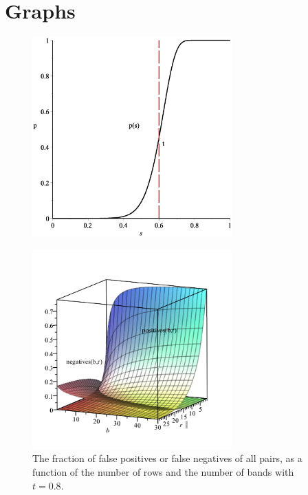 
\section{Graphs}
\label{sec:graph}
\begin{figure}[H]
	\includegraphics[width=290px]{img/pGraphGood.eps}
	\label{fig:p_graph_good}
\end{figure}
\begin{figure}[H]
	\includegraphics[width=290px]{img/falseGraph2.png}
\caption{The fraction of false positives or false negatives of all pairs, as a function of the number of rows and the number of bands with \(t=0.8\).}
\end{figure}